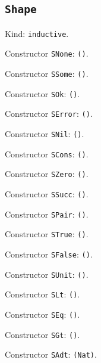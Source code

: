 \documentclass[11pt]{article}
\begin{document}
\subsection*{\texttt{Shape}}
\noindent Kind: \texttt{inductive}.\par
\noindent Constructor \texttt{SNone}: \texttt{()}.\par
\noindent Constructor \texttt{SSome}: \texttt{()}.\par
\noindent Constructor \texttt{SOk}: \texttt{()}.\par
\noindent Constructor \texttt{SError}: \texttt{()}.\par
\noindent Constructor \texttt{SNil}: \texttt{()}.\par
\noindent Constructor \texttt{SCons}: \texttt{()}.\par
\noindent Constructor \texttt{SZero}: \texttt{()}.\par
\noindent Constructor \texttt{SSucc}: \texttt{()}.\par
\noindent Constructor \texttt{SPair}: \texttt{()}.\par
\noindent Constructor \texttt{STrue}: \texttt{()}.\par
\noindent Constructor \texttt{SFalse}: \texttt{()}.\par
\noindent Constructor \texttt{SUnit}: \texttt{()}.\par
\noindent Constructor \texttt{SLt}: \texttt{()}.\par
\noindent Constructor \texttt{SEq}: \texttt{()}.\par
\noindent Constructor \texttt{SGt}: \texttt{()}.\par
\noindent Constructor \texttt{SAdt}: \texttt{(Nat)}.\par
\end{document}
